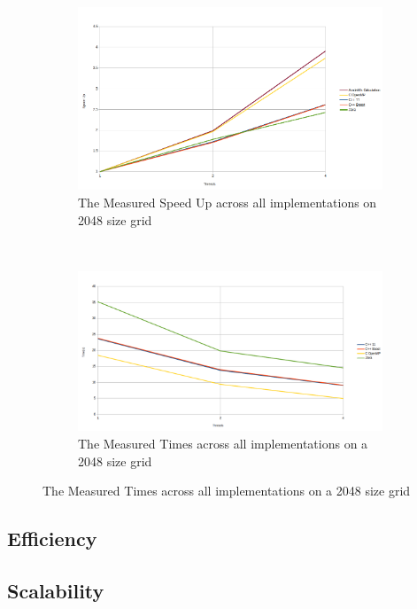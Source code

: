 \documentclass[11pt]{article} %
\begin{document}
\begin{figure}[h]
\centering
\begin{subfigure}[b]{0.8\textwidth}
\centering
\includegraphics[width=\textwidth]{measuredSpeedup2048.png}
\caption{The Measured Speed Up across all implementations on 2048 size grid}
\label{fig: speedup1}
\end{subfigure}
~ 
\begin{subfigure}[b]{1\textwidth}
\centering
\includegraphics[width=\textwidth]{measured204810004.png}
\caption{The Measured Times across all implementations on a 2048 size grid}
\label{fig: measured1}
\end{subfigure}
\end{figure}
\subsection{Efficiency}
\subsection{Scalability}
\end{document}
